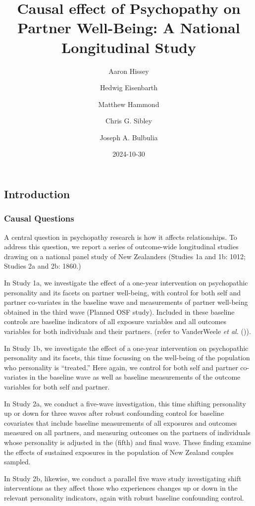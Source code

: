 \documentclass[
  single column]{article}
\title{Causal effect of Psychopathy on Partner Well-Being: A National
Longitudinal Study}
\author{Aaron Hissey}
\affil{%
             \small{     Victoria University of Wellington, New Zealand
          ORCID \textcolor[HTML]{A6CE39}{\aiOrcid} ~ }
              }
\author{Hedwig Eisenbarth}
\affil{%
             \small{     Victoria University of Wellington, New Zealand
          ORCID \textcolor[HTML]{A6CE39}{\aiOrcid} ~ }
              }
\author{Matthew Hammond}
\affil{%
             \small{     School of Psychology, University of Auckland
          ORCID \textcolor[HTML]{A6CE39}{\aiOrcid} ~ }
              }
\author{Chris G. Sibley}
\affil{%
             \small{     School of Psychology, University of Auckland
          ORCID \textcolor[HTML]{A6CE39}{\aiOrcid} ~ }
              }
\author{Joseph A. Bulbulia}
\affil{%
             \small{     Victoria University of Wellington, New Zealand
          ORCID \textcolor[HTML]{A6CE39}{\aiOrcid} ~ }
              }
\date{2024-10-30}
\begin{document}
\maketitle


\subsection{Introduction}\label{introduction}

\subsubsection{Causal Questions}\label{causal-questions}

A central question in psychopathy research is how it affects
relationships. To address this question, we report a series of
outcome-wide longitudinal studies drawing on a national panel study of
New Zealanders (Studies 1a and 1b: 1012; Studies 2a and 2b: 1860.)

In Study 1a, we investigate the effect of a one-year intervention on
psychopathic personality and its facets on partner well-being, with
control for both self and partner co-variates in the baseline wave and
measurements of partner well-being obtained in the third wave (Planned
OSF study). Included in these baseline controls are baseline indicators
of all exposure variables and all outcomes variables for both
individuals and their partners. (refer to VanderWeele \emph{et al.}
()).

In Study 1b, we investigate the effect of a one-year intervention on
psychopathic personality and its facets, this time focussing on the
well-being of the population who personality is ``treated.'' Here again,
we control for both self and partner co-variates in the baseline wave as
well as baseline measurements of the outcome variables for both self and
partner.

In Study 2a, we conduct a five-wave investigation, this time shifting
personality up or down for three waves after robust confounding control
for baseline covariates that include baseline measurements of all
exposures and outcomes measured on all partners, and measuring outcomes
on the partners of individuals whose personality is adjusted in the
(fifth) and final wave. These finding examine the effects of sustained
exposures in the population of New Zealand couples sampled.

In Study 2b, likewise, we conduct a parallel five wave study
investigating shift interventions as they affect those who experiences
changes up or down in the relevant personality indicators, again with
robust baseline confounding control.
\end{document}
